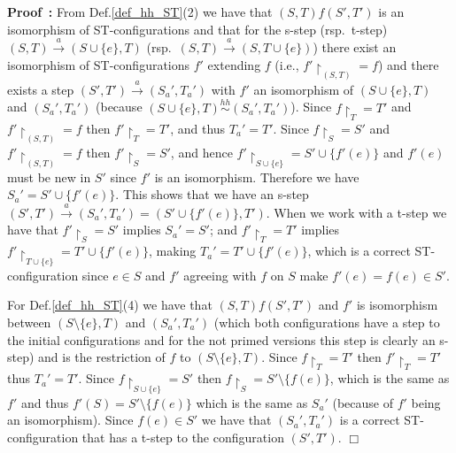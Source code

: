 \documentclass[submission,copyright,creativecommons]{eptcs}
\newtheorem{theorem}{Theorem}[section]
\newenvironment{proof}[1][\!\!\,]{\vspace{1ex}\noindent\textbf{Proof #1: }}{\hfill$\Box$\vspace{2ex}}
\newcommand{\cp}[1]{}
\newcommand\hHDML{\ensuremath{\mathit{hHDML}}}
\newcommand\frestrict[1]{\ensuremath{\upharpoonright_{#1}}}
\newcommand\hhequiv{\ensuremath{\stackrel{hh}{\sim}}}
\newcommand{\transition}[1]{\ensuremath{\xrightarrow{#1}}}
\begin{document}
{{\begin{proof}
From Def.\ref{def_hh_ST}(2) we have that $(S,T)f(S',T')$ is an isomorphism of ST-configurations and that for the s-step (rsp.\ t-step) $(S,T)\transition{a}(S\cup\{e\},T)$ (rsp.\ $(S,T)\transition{a}(S,T\cup\{e\})$) there exist an isomorphism of ST-configurations $f'$ extending $f$ (i.e., $f'\frestrict{(S,T)}=f$) and there exists a step $(S',T')\transition{a}(S_{a}',T_{a}')$ with $f'$ an isomorphism of $(S\cup\{e\},T)$ and $(S_{a}',T_{a}')$ (because $(S\cup\{e\},T)\hhequiv(S_{a}',T_{a}')$). Since $f\frestrict{T}=T'$ and $f'\frestrict{(S,T)}=f$ then $f'\frestrict{T}=T'$, and thus $T_{a}'=T'$. Since $f\frestrict{S}=S'$ and $f'\frestrict{(S,T)}=f$ then $f'\frestrict{S}=S'$, and hence $f'\frestrict{S\cup\{e\}}=S'\cup\{f'(e)\}$ and $f'(e)$ must be new in $S'$ since $f'$ is an isomorphism. Therefore we have $S_{a}'=S'\cup\{f'(e)\}$. This shows that we have an s-step $(S',T')\transition{a}(S_{a}',T_{a}')=(S'\cup\{f'(e)\},T')$. When we work with a t-step we have that $f'\frestrict{S}=S'$ implies $S_{a}'=S'$; and $f'\frestrict{T}=T'$ implies $f'\frestrict{T\cup\{e\}}=T'\cup\{f'(e)\}$, making $T_{a}'=T'\cup\{f'(e)\}$, which is a correct ST-configuration since $e\in S$ and $f'$ agreeing with $f$ on $S$ make $f'(e)=f(e)\in S'$.

For Def.\ref{def_hh_ST}(4) we have that $(S,T)f(S',T')$ and $f'$ is isomorphism between $(S\setminus\{e\},T)$ and $(S_{a}',T_{a}')$ (which both configurations have a step to the initial configurations and for the not primed versions this step is clearly an s-step) and is the restriction of $f$ to $(S\setminus\{e\},T)$. Since $f\frestrict{T}=T'$ then $f'\frestrict{T}=T'$ thus $T_{a}'=T'$. Since $f\frestrict{S\cup\{e\}}=S'$ then $f\frestrict{S}=S'\setminus\{f(e)\}$, which is the same as $f'$ and thus $f'(S)=S'\setminus\{f(e)\}$ which is the same as $S_{a}'$ (because of $f'$ being an isomorphism). Since $f(e)\in S'$ we have that $(S_{a}',T_{a}')$ is a correct ST-configuration that has a t-step to the configuration $(S',T')$.
\end{proof}
}

\cp{!!!Maybe leave this for a journal version.}

\cp{
\begin{theorem}[modal equivalence and\ \ \hhequiv]\label{th_hhSTmodal}
For rooted, connected, and adjacent-closed ST-structures, the modal equivalence induced by \hHDML\ coincides with \hhequiv\ when considering image-finite structures of finite concurrency.
\end{theorem}

}}
\end{document}

